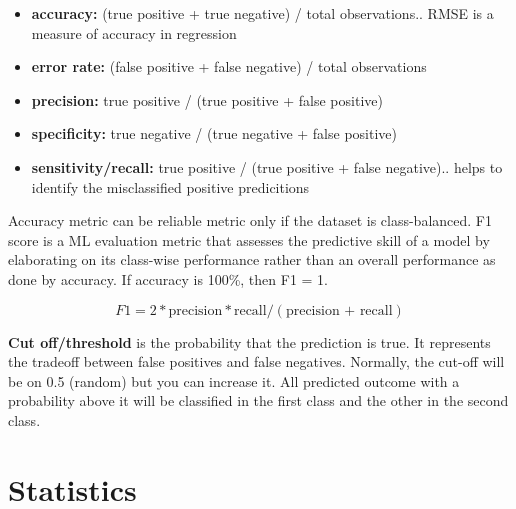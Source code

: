 \documentclass[
  letterpaper,
  DIV=11,
  numbers=noendperiod]{scrreprt}
\providecommand{\tightlist}{%
  \setlength{\itemsep}{0pt}\setlength{\parskip}{0pt}}\usepackage{longtable,booktabs,array}
\begin{document}
\begin{itemize}
  \begin{itemize}
  \tightlist
  \item
    \textbf{accuracy:} (true positive + true negative) / total
    observations.. RMSE is a measure of accuracy in regression
  \item
    \textbf{error rate:} (false positive + false negative) / total
    observations
  \item
    \textbf{precision:} true positive / (true positive + false positive)
  \item
    \textbf{specificity:} true negative / (true negative + false
    positive)
  \item
    \textbf{sensitivity/recall:} true positive / (true positive + false
    negative).. helps to identify the misclassified positive
    predicitions
  \end{itemize}

  Accuracy metric can be reliable metric only if the dataset is
  class-balanced. F1 score is a ML evaluation metric that assesses the
  predictive skill of a model by elaborating on its class-wise
  performance rather than an overall performance as done by accuracy. If
  accuracy is 100\%, then F1 = 1.

  \[ F1 = 2 * \text{precision} * \text{recall} / (\text{precision + recall}) \]

  \textbf{Cut off/threshold} is the probability that the prediction is
  true. It represents the tradeoff between false positives and false
  negatives. Normally, the cut-off will be on 0.5 (random) but you can
  increase it. All predicted outcome with a probability above it will be
  classified in the first class and the other in the second class.
\end{itemize}

\hypertarget{statistics}{%
\section{Statistics}\label{statistics}}
\end{document}
